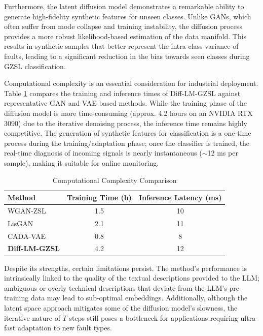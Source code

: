 Furthermore, the latent diffusion model demonstrates a remarkable ability to generate high-fidelity synthetic features for unseen classes. Unlike GANs, which often suffer from mode collapse and training instability, the diffusion process provides a more robust likelihood-based estimation of the data manifold. This results in synthetic samples that better represent the intra-class variance of faults, leading to a significant reduction in the bias towards seen classes during GZSL classification.

Computational complexity is an essential consideration for industrial deployment. Table \ref{tab:time_complexity} compares the training and inference times of Diff-LM-GZSL against representative GAN and VAE based methods. While the training phase of the diffusion model is more time-consuming (approx. 4.2 hours on an NVIDIA RTX 3090) due to the iterative denoising process, the inference time remains highly competitive. The generation of synthetic features for classification is a one-time process during the training/adaptation phase; once the classifier is trained, the real-time diagnosis of incoming signals is nearly instantaneous ($\sim$12 ms per sample), making it suitable for online monitoring.

\begin{table}[ht]
\centering
\caption{Computational Complexity Comparison}
\label{tab:time_complexity}
\begin{tabular}{lcc}
\hline
Method & Training Time (h) & Inference Latency (ms) \\ \hline
WGAN-ZSL & 1.5 & 10 \\
LisGAN & 2.1 & 11 \\
CADA-VAE & 0.8 & 8 \\
\textbf{Diff-LM-GZSL} & 4.2 & 12 \\ \hline
\end{tabular}
\end{table}

Despite its strengths, certain limitations persist. The method's performance is intrinsically linked to the quality of the textual descriptions provided to the LLM; ambiguous or overly technical descriptions that deviate from the LLM’s pre-training data may lead to sub-optimal embeddings. Additionally, although the latent space approach mitigates some of the diffusion model's slowness, the iterative nature of $T$ steps still poses a bottleneck for applications requiring ultra-fast adaptation to new fault types.

